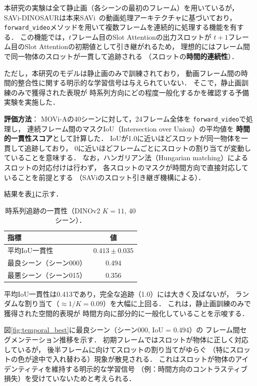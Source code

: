 \documentclass[dvipdfmx,twocolumn]{jarticle}
\begin{document}
本研究の実験は全て静止画（各シーンの最初のフレーム）を用いているが，
SAVi-DINOSAURは本来SAVi~\cite{kipf2022}の動画処理アーキテクチャに基づいており，
\texttt{forward\_video}メソッドを用いて複数フレームを連続的に処理する機能を有する．
この機能では，$t$フレーム目のSlot Attentionの出力スロットが
$t{+}1$フレーム目のSlot Attentionの初期値として引き継がれるため，
理想的にはフレーム間で同一物体のスロットが一貫して追跡される
（スロットの\textbf{時間的連続性}）．

ただし，本研究のモデルは静止画のみで訓練されており，
動画フレーム間の時間的整合性に関する明示的な学習信号は与えられていない．
そこで，静止画訓練のみで獲得された表現が
時系列方向にどの程度一般化するかを確認する予備実験を実施した．

\textbf{評価方法}：
MOVi-Aの40シーンに対して，24フレーム全体を
\texttt{forward\_video}で処理し，
連続フレーム間のマスクIoU（Intersection over Union）の平均値を
\textbf{時間的一貫性スコア}として計算した．
IoUが1.0に近いほどスロットが同一物体を一貫して追跡しており，
0に近いほどフレームごとにスロットの割り当てが変動していることを意味する．
なお，ハンガリアン法（Hungarian matching）によるスロットの対応付けは行わず，
各スロットのマスクが時間方向で直接対応していることを前提とする
（SAViのスロット引き継ぎ機構による）．

結果を表\ref{tab:temporal_stats}に示す．

\begin{table}[t]
\centering
\caption{時系列追跡の一貫性（DINOv2 $K{=}11$, 40シーン）．}
\label{tab:temporal_stats}
\small
\begin{tabular}{lc}
\toprule
指標 & 値 \\
\midrule
平均IoU一貫性 & $0.413 \pm 0.035$ \\
最良シーン（シーン000） & 0.494 \\
最悪シーン（シーン015） & 0.356 \\
\bottomrule
\end{tabular}
\end{table}

平均IoU一貫性は0.413であり，完全な追跡（1.0）には大きく及ばないが，
ランダムな割り当て（${\approx}1/K{=}0.09$）を大幅に上回る．
これは，静止画訓練のみで獲得された空間的表現が
時間方向に部分的に一般化していることを示唆する．

図\ref{fig:temporal_best}に最良シーン（シーン000, IoU = 0.494）の
フレーム間セグメンテーション推移を示す．
初期フレームではスロットが物体に正しく対応しているが，
後半フレームに向けてスロットの割り当てがゆらぐ
（特にスロットの色が途中で入れ替わる）現象が散見される．
これはスロットが物体のアイデンティティを維持する明示的な学習信号
（例：時間方向のコントラスティブ損失）を受けていないためと考えられる．
\end{document}
